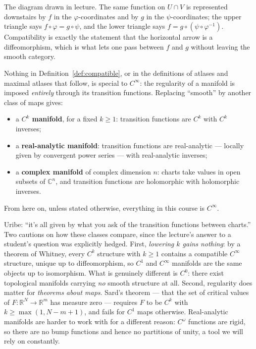 \documentclass[11pt]{report}
\makeatletter
\newcounter{defcounter}[section]
\newcommand{\deflabel}[1]{\edef\@currentlabel{\arabic{section}.\arabic{defcounter}}\label{#1}}
\newcommand{\leeref}[1]{\par\smallskip{\raggedleft\footnotesize\textsc{Lee}:\ #1\par}}
\makeatother
\begin{document}
The diagram drawn in lecture. The same function on $U \cap V$ is represented downstairs by $f$ in the $\varphi$-coordinates and by $g$ in the $\psi$-coordinates; the upper triangle says $f \circ \varphi = g \circ \psi$, and the lower triangle says $f = g \circ (\psi \circ \varphi^{-1})$. Compatibility is exactly the statement that the horizontal arrow is a diffeomorphism, which is what lets one pass between $f$ and $g$ without leaving the smooth category.

\begin{defbox}\deflabel{def:regularity-classes}
Nothing in Definition~\ref{def:compatible}, or in the definitions of atlases and maximal atlases that follow, is special to $C^\infty$: the regularity of a manifold is imposed \emph{entirely} through its transition functions. Replacing ``smooth'' by another class of maps gives:
\begin{itemize}
    \item a \textbf{$C^k$ manifold}, for a fixed $k \ge 1$: transition functions are $C^k$ with $C^k$ inverses;
    \item a \textbf{real-analytic manifold}: transition functions are real-analytic --- locally given by convergent power series --- with real-analytic inverses;
    \item a \textbf{complex manifold} of complex dimension $n$: charts take values in open subsets of $\mathbb{C}^n$, and transition functions are holomorphic with holomorphic inverses.
\end{itemize}
From here on, unless stated otherwise, everything in this course is $C^\infty$.
\leeref{Ch.~1, \emph{Smooth Structures}}
\end{defbox}

\begin{rembox}\label{rem:comparing-classes}
Uribe: ``it's all given by what you ask of the transition functions between charts.'' Two cautions on how these classes compare, since the lecture's answer to a student's question was explicitly hedged. First, \emph{lowering $k$ gains nothing}: by a theorem of Whitney, every $C^k$ structure with $k \ge 1$ contains a compatible $C^\infty$ structure, unique up to diffeomorphism, so $C^1$ and $C^\infty$ manifolds are the same objects up to isomorphism. What is genuinely different is $C^0$: there exist topological manifolds carrying \emph{no} smooth structure at all. Second, regularity does matter for \emph{theorems about maps}. Sard's theorem --- that the set of critical values of $F : \mathbb{R}^N \to \mathbb{R}^m$ has measure zero --- requires $F$ to be $C^k$ with $k \ge \max(1, N-m+1)$, and fails for $C^1$ maps otherwise. Real-analytic manifolds are harder to work with for a different reason: $C^\omega$ functions are rigid, so there are no bump functions and hence no partitions of unity, a tool we will rely on constantly.
\end{rembox}
\end{document}
